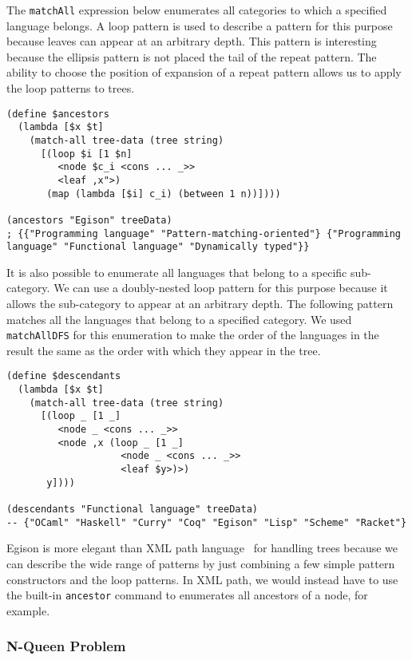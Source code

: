 \documentclass{article}
\begin{document}
The \texttt{matchAll} expression below enumerates all categories to which a specified language belongs.
A loop pattern is used to describe a pattern for this purpose because leaves can appear at an arbitrary depth.
This pattern is interesting because the ellipsis pattern is not placed the tail of the repeat pattern.
The ability to choose the position of expansion of a repeat pattern allows us to apply the loop patterns to trees.

\begin{lstlisting}[language=egison]
(define $ancestors
  (lambda [$x $t]
    (match-all tree-data (tree string)
      [(loop $i [1 $n]
         <node $c_i <cons ... _>>
         <leaf ,x">)
       (map (lambda [$i] c_i) (between 1 n))])))

(ancestors "Egison" treeData)
; {{"Programming language" "Pattern-matching-oriented"} {"Programming language" "Functional language" "Dynamically typed"}}
\end{lstlisting}

It is also possible to enumerate all languages that belong to a specific sub-category.
We can use a doubly-nested loop pattern for this purpose because it allows the sub-category to appear at an arbitrary depth.
The following pattern matches all the languages that belong to a specified category.
We used \texttt{matchAllDFS} for this enumeration to make the order of the languages in the result the same as the order with which they appear in the tree.

\begin{lstlisting}[language=egison]
(define $descendants
  (lambda [$x $t]
    (match-all tree-data (tree string)
      [(loop _ [1 _]
         <node _ <cons ... _>>
         <node ,x (loop _ [1 _]
                    <node _ <cons ... _>>
                    <leaf $y>)>)
       y])))

(descendants "Functional language" treeData)
-- {"OCaml" "Haskell" "Curry" "Coq" "Egison" "Lisp" "Scheme" "Racket"}
\end{lstlisting}

Egison is more elegant than XML path language~\cite{berglund2003xml} for handling trees because we can describe the wide range of patterns by just combining a few simple pattern constructors and the loop patterns.
In XML path, we would instead have to use the built-in \texttt{ancestor} command to enumerates all ancestors of a node, for example.

\subsubsection{N-Queen Problem}\label{n-queen}
\end{document}
